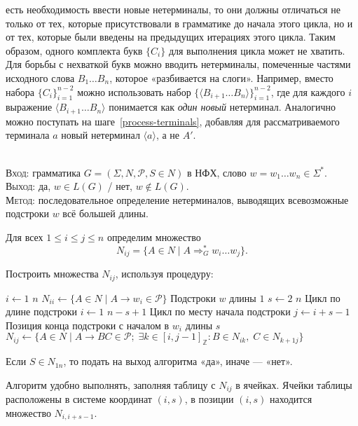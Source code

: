 \begin{NumAlgo}
\begin{Remark}
есть необходимость ввести новые нетерминалы, то они должны отличаться не только
от тех, которые присутствовали в грамматике до начала этого цикла, но и от тех,
которые были введены на предыдущих итерациях этого цикла. Таким образом, одного
комплекта букв $\{C_i\}$ для выполнения цикла может не хватить. Для борьбы с
нехваткой букв можно вводить нетерминалы, помеченные частями исходного слова
$B_1\ldots B_n$, которое «разбивается на слоги». Например, вместо набора
$\{C_i\}_{i=1}^{n-2}$ можно использовать набор $\{ \langle B_{i+1}\ldots B_n
\rangle \}_{i=1}^{n-2}$, где для каждого $i$ выражение $\langle B_{i+1}\ldots B_n \rangle$
понимается как \emph{один новый} нетерминал. Аналогично можно поступать на
шаге~\ref{process-terminals}, добавляя для рассматриваемого терминала $a$ новый
нетерминал $\langle a \rangle$, а не $A'$.
\end{Remark}
\end{NumAlgo}

\begin{NumAlgo} 
\nspace\\
\textsc{Вход}: грамматика $G=(\Sigma, N, \mathcal P, S \in N)$ в НФХ,
слово $w = w_1 \ldots w_n \in \Sigma^*$.\\
\textsc{Выход}: да, $w \in L(G)$ / нет, $w \not \in L(G)$.\\
\textsc{Метод}: последовательное определение нетерминалов, выводящих
всевозможные подстроки $w$ всё большей длины.

Для всех $1 \leqslant i \leqslant j \leqslant n$ определим множество 
$$
    N_{ij} = \{ A \in N \mid A \Rightarrow^*_G w_i \ldots w_j \}.
$$

Построить множества $N_{ij}$, используя процедуру:
\begin{codebox}
\zi\For $i \gets 1$ \To $n$
\zi     \Do
        $N_{ii} \gets \{ A \in N \mid A \to w_i \in \mathcal P  \}$ 
        \Comment Подстроки $w$ длины $1$
        \End
\zi\For $s \gets 2$ \To $n$ \Comment Цикл по длине подстроки
\zi     \Do
        \For $i \gets 1$ \To $n - s + 1$ \Comment Цикл по месту начала подстроки
\zi         $j \gets i + s - 1$ 
            \Comment Позиция конца подстроки с началом в $w_i$ длины $s$
\zi         $N_{ij} \gets \{ A \in N \mid A \to BC \in \mathcal P; \;
                \exists k \in [i, j-1]_{\mathbb Z} \colon B \in N_{ik}, \; 
                C \in N_{k+1 j} \} $
        \End
\end{codebox}
Если $S \in N_{1n}$, то подать на выход алгоритма «да», иначе — «нет».
\end{NumAlgo}
\begin{Remark}
Алгоритм удобно выполнять, заполняя таблицу с $N_{ij}$ в ячейках. Ячейки таблицы
расположены в системе координат $(i,s)$, в позиции $(i,s)$ находится множество
$N_{i, i+s-1}$.
\end{Remark}

